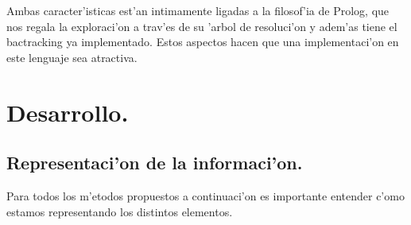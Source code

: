 \documentclass[12pt]{article}
\begin{document}
    Ambas caracter'isticas est'an intimamente ligadas a la filosof'ia de Prolog, que nos regala la exploraci'on a trav'es
    de su 'arbol de resoluci'on y adem'as tiene el bactracking ya implementado. Estos aspectos hacen que una
    implementaci'on en este lenguaje sea atractiva.




    \section{Desarrollo.}\label{section: desarrollo}

    \subsection{Representaci'on de la informaci'on.}
    Para todos los m'etodos propuestos a continuaci'on es importante
    entender c'omo estamos representando los distintos
    elementos.
\end{document}
